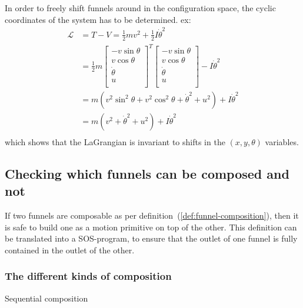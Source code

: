 In order to freely shift funnels around in the configuration space, the cyclic
coordinates of the system has to be determined. ex:
\begin{align}
  \mathcal{L} &= T - V = \frac{1}{2} mv^2 + \frac{1}{2}I\dot{\theta}^2 \\ 
              &= \frac{1}{2} 
                m\begin{bmatrix}
                  -v\sin \theta \\ 
                  v \cos \theta \\
                  \dot{\theta} \\
                  u \\
                \end{bmatrix}^{T}
  \begin{bmatrix}
    -v\sin \theta \\
    v \cos \theta \\
    \dot{\theta} \\
    u \\
  \end{bmatrix}
  - I\dot{\theta}^2 \\
              &= m \left(
                v^2 \sin^2 \theta + v^2 \cos^2 \theta + {\dot{\theta}}^2 + u^2
                \right)  + I {\dot{\theta}}^2 \\
              &= m(v^2 + {\dot{\theta}}^2 + u^2) + I {\dot{\theta}}^2 \\
\end{align}
which shows that the LaGrangian is invariant to shifts in the \((x,y,\theta)\)
variables.

\subsection{Checking which funnels can be composed and not}
\label{sec:composable-funnels}

If two funnels are composable as per definition~(\ref{def:funnel-composition}),
then it is safe to build one as a motion primitive on top of the other. This
definition can be translated into a \ac{SOS}-program, to ensure that the outlet
of one funnel is fully contained in the outlet of the other.

\subsubsection{The different kinds of composition}

Sequential composition

